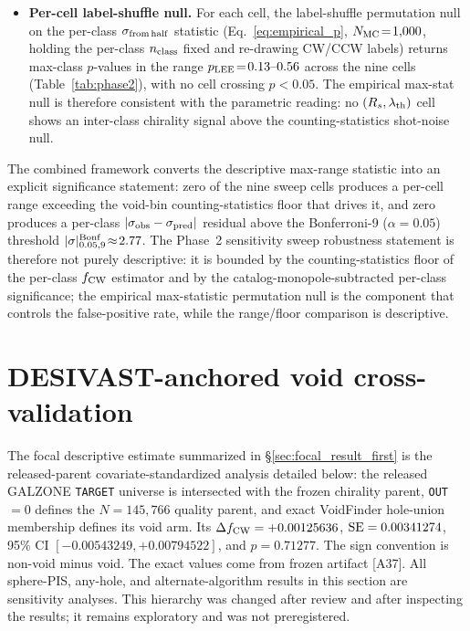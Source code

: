 \documentclass[aps,prd,twocolumn,superscriptaddress,showpacs,preprintnumbers,nofootinbib,longbibliography,floatfix]{revtex4-2}
\begin{document}
\begin{itemize}
\item \textbf{Per-cell label-shuffle null.} For each cell, the
label-shuffle permutation null on the per-class $\sigma_{\rm from\,half}$
statistic (Eq.~\eqref{eq:empirical_p}, $N_{\rm MC}\!=\!1{,}000$,
holding the per-class $n_{\rm class}$ fixed and re-drawing CW/CCW
labels) returns max-class $p$-values in the range $p_{\rm LEE}\!=\!
0.13\text{--}0.56$ across the nine cells (Table~\ref{tab:phase2}),
with no cell crossing
$p\!<\!0.05$. The empirical max-stat null is therefore consistent
with the parametric reading: no $(R_s, \lambda_{\rm th})$ cell shows
an inter-class chirality signal above the counting-statistics
shot-noise null.
\end{itemize}

The combined framework converts the descriptive max-range statistic
into an explicit significance statement: zero of the nine sweep
cells produces a per-cell range exceeding the void-bin
counting-statistics floor that drives it, and zero produces a per-class
$|\sigma_{\rm obs}-\sigma_{\rm pred}|$ residual above the Bonferroni-9
($\alpha
= 0.05$) threshold $|\sigma|^{\rm Bonf}_{0.05,9}\!\approx\!2.77$. The
Phase~2 sensitivity sweep robustness statement is therefore not
purely descriptive: it is bounded by the counting-statistics floor
of the per-class $f_{\rm CW}$ estimator and by the
catalog-monopole-subtracted per-class significance; the empirical
max-statistic permutation null is the component that controls the
false-positive rate, while the range/floor comparison is descriptive.

\section{DESIVAST-anchored void cross-validation}\label{sec:desivast_primary}

The focal descriptive estimate summarized in
\S\ref{sec:focal_result_first} is the released-parent
covariate-standardized analysis detailed below: the released GALZONE
\texttt{TARGET} universe is intersected with the frozen chirality parent,
\texttt{OUT}$=0$ defines the $N=145{,}766$ quality parent, and exact
VoidFinder hole-union membership defines its void arm. Its
$\Delta f_{\rm CW}=+0.00125636$,
${\rm SE}=0.00341274$, 95\% CI
$[-0.00543249,+0.00794522]$, and $p=0.71277$. The sign convention is
non-void minus void. The exact values come from frozen artifact [A37].
All sphere-PIS, any-hole, and alternate-algorithm results in this
section are sensitivity analyses. This hierarchy was changed after
review and after inspecting the results; it remains exploratory and
was not preregistered.
\end{document}
